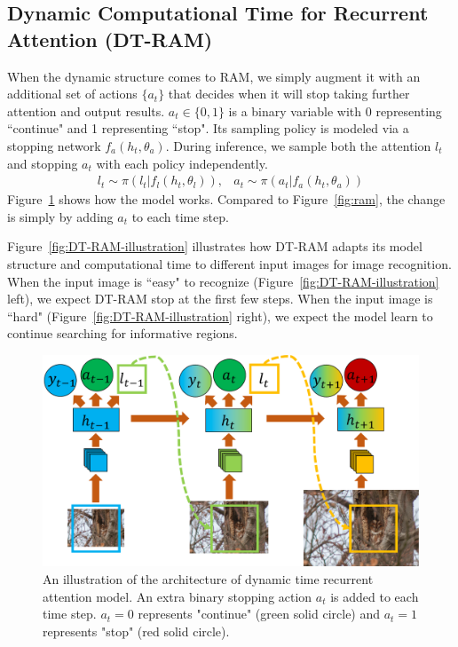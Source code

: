 \documentclass[10pt,twocolumn,letterpaper]{article}
\begin{document}
\subsection{Dynamic Computational Time for Recurrent Attention (DT-RAM)}

When the dynamic structure comes to RAM, we simply augment it with an additional set of actions $\{a_t\}$ that decides when it will stop taking further attention and output results.
$a_t \in \{0, 1\}$ is a binary variable with 0 representing ``continue" and 1 representing ``stop".
Its sampling policy is modeled via a stopping network $f_a(h_t, \theta_a)$.
During inference, we sample both the attention $l_t$ and stopping $a_t$ with each policy independently.
\begin{eqnarray}
l_t \sim \pi(l_t | f_l(h_t, \theta_l)), & a_t \sim \pi(a_t | f_a(h_t, \theta_a))
\end{eqnarray}
Figure~\ref{fig:DT-RAM} shows how the model works.
Compared to Figure~\ref{fig:ram}, the change is simply by adding $a_t$ to each time step.

Figure~\ref{fig:DT-RAM-illustration} illustrates how DT-RAM adapts its model structure and computational time to different input images for image recognition.
When the input image is ``easy" to recognize (Figure~\ref{fig:DT-RAM-illustration} left), we expect DT-RAM stop at the first few steps.
When the input image is ``hard" (Figure~\ref{fig:DT-RAM-illustration} right), we expect the model learn to continue searching for informative regions.

\setlength{\tabcolsep}{1pt}
\begin{figure}
\begin{center}
    \includegraphics[width=0.95\linewidth]{figs/model/dynamic_ram.pdf}
\end{center}
\caption{An illustration of the architecture of dynamic time recurrent attention model. An extra binary stopping action $a_t$ is added to each time step. $a_t=0$ represents "continue" (green solid circle) and $a_t=1$ represents "stop" (red solid circle).}
\label{fig:DT-RAM}
\end{figure}
\end{document}
